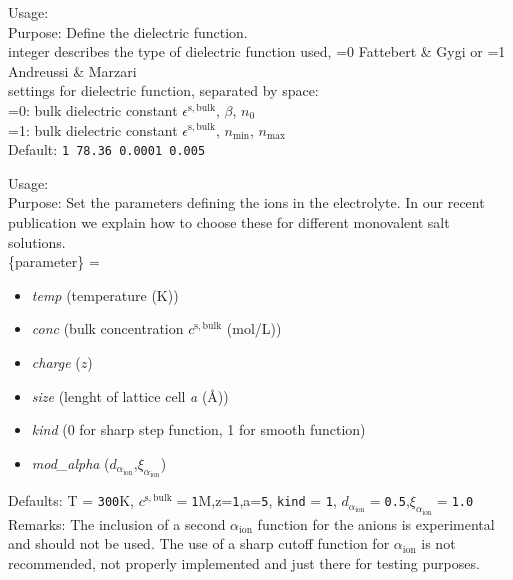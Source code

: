 {
  \noindent
  Usage:   \\[1.0ex]
  Purpose: Define the dielectric function. \\[1.0ex]
   integer describes the type of dielectric function used, =0 Fattebert \& Gygi\cite{Fattebert2002} or =1 Andreussi \& Marzari\cite{Andreussi2012}\\[1.0ex]
   settings for dielectric function, separated by space:\\
    =0: bulk dielectric constant $\epsilon^\mathrm{s,bulk}$, $\beta$, $n_0$\\[1.0ex]
    =1: bulk dielectric constant $\epsilon^\mathrm{s,bulk}$, $n_\mathrm{min}$, $n_\mathrm{max}$\\[1.0ex]
  Default: \texttt{1 78.36 0.0001 0.005}\cite{Andreussi2012} 
}

{
  \noindent
  Usage:   \\[1.0ex]
  Purpose: Set the parameters defining the ions in the electrolyte. In our recent publication\cite{Ringe2017} we explain how to choose these for different monovalent salt solutions. \\[1.0ex]
   \{parameter\} = 
  \begin{itemize}
  \item \textit{temp} (temperature (K))
  \item  \textit{conc} (bulk concentration $c^\mathrm{s,bulk}$ (mol/L))
  \item  \textit{charge} ($z$)
  \item \textit{size} (lenght of lattice cell \textit{a} (\AA))
  \item \textit{kind} (0 for sharp step function, 1 for smooth function)
  \item \textit{mod\_alpha} ($d_{\alpha_\mathrm{ion}}$,$\xi_{\alpha_\mathrm{ion}}$)
  \end{itemize}  
  Defaults: T = \texttt{300}K, $c^\mathrm{s,bulk} = $\texttt{1}M,z=\texttt{1},a=\texttt{5}, \texttt{kind} = \texttt{1}, $d_{\alpha_\mathrm{ion}}=$\texttt{0.5},$\xi_{\alpha_\mathrm{ion}}=$\texttt{1.0}\\[1.0ex]
  Remarks: The inclusion of a second $\alpha_\mathrm{ion}$ function for the anions is experimental and should not be used. The use of a sharp cutoff function for $\alpha_\mathrm{ion}$ is not recommended, not properly implemented and just there for testing purposes.
}

